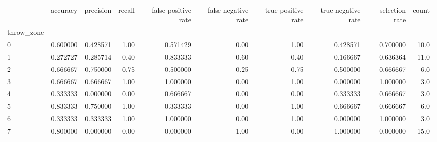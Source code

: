 \begin{tabular}{lrrrrrrrrr}
\toprule
{} &  accuracy &  precision &  recall &  false positive rate &  false negative rate &  true positive rate &  true negative rate &  selection rate &  count \\
throw\_zone &           &            &         &                      &                      &                     &                     &                 &        \\
\midrule
0          &  0.600000 &   0.428571 &    1.00 &             0.571429 &                 0.00 &                1.00 &            0.428571 &        0.700000 &   10.0 \\
1          &  0.272727 &   0.285714 &    0.40 &             0.833333 &                 0.60 &                0.40 &            0.166667 &        0.636364 &   11.0 \\
2          &  0.666667 &   0.750000 &    0.75 &             0.500000 &                 0.25 &                0.75 &            0.500000 &        0.666667 &    6.0 \\
3          &  0.666667 &   0.666667 &    1.00 &             1.000000 &                 0.00 &                1.00 &            0.000000 &        1.000000 &    3.0 \\
4          &  0.333333 &   0.000000 &    0.00 &             0.666667 &                 0.00 &                0.00 &            0.333333 &        0.666667 &    3.0 \\
5          &  0.833333 &   0.750000 &    1.00 &             0.333333 &                 0.00 &                1.00 &            0.666667 &        0.666667 &    6.0 \\
6          &  0.333333 &   0.333333 &    1.00 &             1.000000 &                 0.00 &                1.00 &            0.000000 &        1.000000 &    3.0 \\
7          &  0.800000 &   0.000000 &    0.00 &             0.000000 &                 1.00 &                0.00 &            1.000000 &        0.000000 &   15.0 \\
\bottomrule
\end{tabular}
